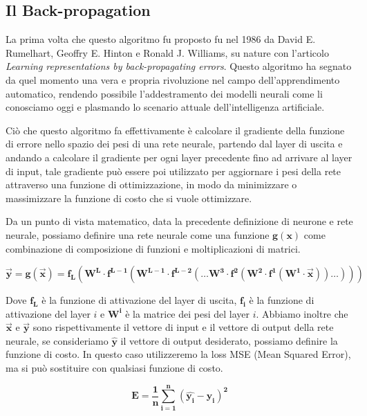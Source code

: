\subsection{Il Back-propagation}

La prima volta che questo algoritmo fu proposto fu nel 1986 da David E. Rumelhart, Geoffry E. Hinton e Ronald J. Williams, su nature
con l'articolo \textit{Learning representations by back-propagating errors}.
Questo algoritmo ha segnato da quel momento una vera e propria rivoluzione nel campo dell'apprendimento automatico, rendendo possibile l'addestramento dei
modelli neurali come li conosciamo oggi e plasmando lo scenario attuale dell'intelligenza artificiale.

Ciò che questo algoritmo fa effettivamente è calcolare il gradiente della funzione di errore nello spazio dei pesi di una rete neurale, 
partendo dal layer di uscita e andando a calcolare il gradiente per ogni layer precedente fino ad arrivare al layer di input, tale gradiente può essere poi
utilizzato per aggiornare i pesi della rete attraverso una funzione di ottimizzazione, in modo da minimizzare o massimizzare la funzione di costo che si vuole ottimizzare.

Da un punto di vista matematico, data la precedente definizione di neurone e rete neurale, possiamo definire una rete neurale come una funzione $\mathbf{g(x)}$
come combinazione di composizione di funzioni e moltiplicazioni di matrici.

\begin{equation}
    \mathbf{\vec{y} = g(\vec{x}) = f_{L}(\mathbf{W^{L} \cdot f^{L-1}(W^{L-1} \cdot f^{L-2}(\dots W^{3} \cdot f^{2}(W^{2} \cdot f^{1}(W^{1} \cdot \vec{x})) \dots ))})}
\end{equation}

Dove $\mathbf{f_{L}}$ è la funzione di attivazione del layer di uscita, $\mathbf{f_{i}}$ è la funzione di attivazione del layer $i$ e $\mathbf{W^{i}}$ è la matrice dei pesi del layer $i$.
Abbiamo inoltre che $\mathbf{\vec{x}}$ e $\mathbf{\vec{y}}$ sono rispettivamente il vettore di input e il vettore di output della rete neurale, se consideriamo
$\mathbf{\hat{y}}$ il vettore di output desiderato, possiamo definire la funzione di costo. In questo caso utilizzeremo la loss MSE (Mean Squared Error), ma
si può sostituire con qualsiasi funzione di costo.

\begin{equation}
    \mathbf{E = \frac{1}{n} \sum_{i=1}^{n} (\hat{y_{i}} - y_{i})^2}
\end{equation}

